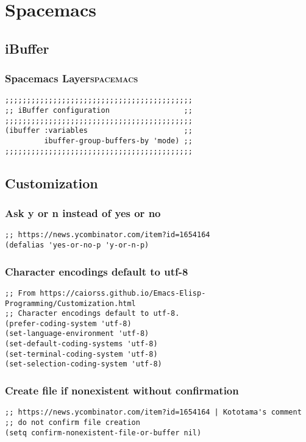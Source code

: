 \documentclass[11pt]{article}
\begin{document}
\section{Spacemacs}
\label{sec:org8977cb4}
\subsection{iBuffer}
\label{sec:orge47f0dc}
\subsubsection{Spacemacs Layer\hfill{}\textsc{spacemacs}}
\label{sec:org8cee790}
\begin{verbatim}
;;;;;;;;;;;;;;;;;;;;;;;;;;;;;;;;;;;;;;;;;;;
;; iBuffer configuration                 ;;
;;;;;;;;;;;;;;;;;;;;;;;;;;;;;;;;;;;;;;;;;;;
(ibuffer :variables                      ;;
         ibuffer-group-buffers-by 'mode) ;;
;;;;;;;;;;;;;;;;;;;;;;;;;;;;;;;;;;;;;;;;;;;
\end{verbatim}

\subsection{Customization}
\label{sec:org4451e40}

\subsubsection{Ask y or n instead of yes or no}
\label{sec:org5366d41}
\begin{verbatim}
;; https://news.ycombinator.com/item?id=1654164
(defalias 'yes-or-no-p 'y-or-n-p)
\end{verbatim}

\subsubsection{Character encodings default to utf-8}
\label{sec:orgdc8783b}
\begin{verbatim}
;; From https://caiorss.github.io/Emacs-Elisp-Programming/Customization.html
;; Character encodings default to utf-8.
(prefer-coding-system 'utf-8)
(set-language-environment 'utf-8)
(set-default-coding-systems 'utf-8)
(set-terminal-coding-system 'utf-8)
(set-selection-coding-system 'utf-8)
\end{verbatim}

\subsubsection{Create file if nonexistent without confirmation}
\label{sec:org6dfafe9}
\begin{verbatim}
;; https://news.ycombinator.com/item?id=1654164 | Kototama's comment
;; do not confirm file creation
(setq confirm-nonexistent-file-or-buffer nil)
\end{verbatim}
\end{document}

